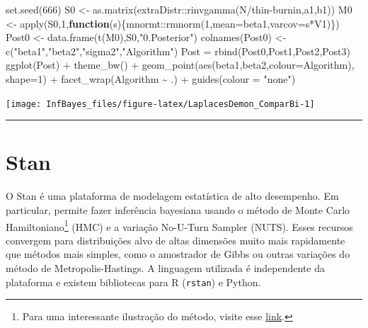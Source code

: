 \documentclass[
]{book}
\newenvironment{Shaded}{\begin{snugshade}}{\end{snugshade}}
\newcommand{\AttributeTok}[1]{\textcolor[rgb]{0.77,0.63,0.00}{#1}}
\newcommand{\ControlFlowTok}[1]{\textcolor[rgb]{0.13,0.29,0.53}{\textbf{#1}}}
\newcommand{\DecValTok}[1]{\textcolor[rgb]{0.00,0.00,0.81}{#1}}
\newcommand{\FunctionTok}[1]{\textcolor[rgb]{0.00,0.00,0.00}{#1}}
\newcommand{\NormalTok}[1]{#1}
\newcommand{\OtherTok}[1]{\textcolor[rgb]{0.56,0.35,0.01}{#1}}
\newcommand{\SpecialCharTok}[1]{\textcolor[rgb]{0.00,0.00,0.00}{#1}}
\newcommand{\StringTok}[1]{\textcolor[rgb]{0.31,0.60,0.02}{#1}}
\begin{document}
\begin{Shaded}
\begin{Highlighting}[]
\FunctionTok{set.seed}\NormalTok{(}\DecValTok{666}\NormalTok{)}
\NormalTok{S0 }\OtherTok{\textless{}{-}} \FunctionTok{as.matrix}\NormalTok{(extraDistr}\SpecialCharTok{::}\FunctionTok{rinvgamma}\NormalTok{(N}\SpecialCharTok{/}\NormalTok{thin}\SpecialCharTok{{-}}\NormalTok{burnin,a1,b1))}
\NormalTok{M0 }\OtherTok{\textless{}{-}} \FunctionTok{apply}\NormalTok{(S0,}\DecValTok{1}\NormalTok{,}\ControlFlowTok{function}\NormalTok{(s)\{mnormt}\SpecialCharTok{::}\FunctionTok{rmnorm}\NormalTok{(}\DecValTok{1}\NormalTok{,}\AttributeTok{mean=}\NormalTok{beta1,}\AttributeTok{varcov=}\NormalTok{s}\SpecialCharTok{*}\NormalTok{V1)\})}
\NormalTok{Post0 }\OtherTok{\textless{}{-}} \FunctionTok{data.frame}\NormalTok{(}\FunctionTok{t}\NormalTok{(M0),S0,}\StringTok{"0.Posterior"}\NormalTok{)}
\FunctionTok{colnames}\NormalTok{(Post0) }\OtherTok{\textless{}{-}} \FunctionTok{c}\NormalTok{(}\StringTok{"beta1"}\NormalTok{,}\StringTok{"beta2"}\NormalTok{,}\StringTok{"sigma2"}\NormalTok{,}\StringTok{"Algorithm"}\NormalTok{)}
\NormalTok{Post }\OtherTok{=} \FunctionTok{rbind}\NormalTok{(Post0,Post1,Post2,Post3)}
\FunctionTok{ggplot}\NormalTok{(Post) }\SpecialCharTok{+} \FunctionTok{theme\_bw}\NormalTok{() }\SpecialCharTok{+}
  \FunctionTok{geom\_point}\NormalTok{(}\FunctionTok{aes}\NormalTok{(beta1,beta2,}\AttributeTok{colour=}\NormalTok{Algorithm), }\AttributeTok{shape=}\DecValTok{1}\NormalTok{) }\SpecialCharTok{+}
  \FunctionTok{facet\_wrap}\NormalTok{(Algorithm }\SpecialCharTok{\textasciitilde{}}\NormalTok{ .) }\SpecialCharTok{+} \FunctionTok{guides}\NormalTok{(}\AttributeTok{colour =} \StringTok{"none"}\NormalTok{)}
\end{Highlighting}
\end{Shaded}

\begin{center}\texttt{[image: InfBayes\_files/figure-latex/LaplacesDemon\_ComparBi-1]} \end{center}

\begin{center}\rule{0.5\linewidth}{0.5pt}\end{center}

\hypertarget{stan}{%
\section{Stan}\label{stan}}

O Stan é uma plataforma de modelagem estatística de alto desempenho. Em particular, permite fazer inferência bayesiana usando o método de Monte Carlo Hamiltoniano\footnote{Para uma interessante ilustração do método, visite esse \href{https://arogozhnikov.github.io/2016/12/19/markov_chain_monte_carlo.html}{link}.} (HMC) e a variação No-U-Turn Sampler (NUTS). Esses recursos convergem para distribuições alvo de altas dimensões muito mais rapidamente que métodos mais simples, como o amostrador de Gibbs ou outras variações do método de Metropolis-Hastings. A linguagem utilizada é independente da plataforma e existem bibliotecas para R (\texttt{rstan}) e Python.
\end{document}

